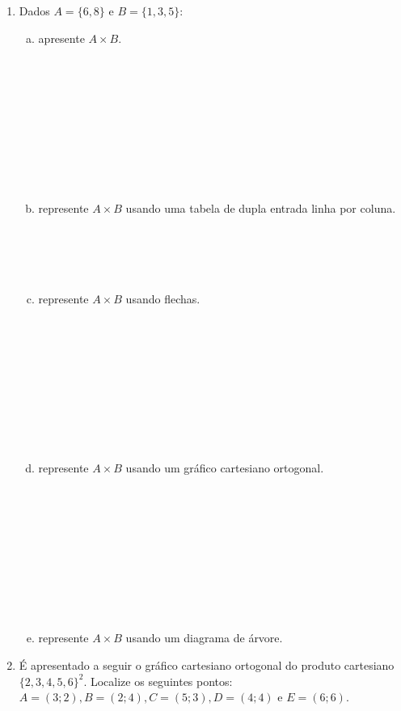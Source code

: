 \documentclass[a4paper,14pt]{article}
\begin{document}
\begin{multicols}{2}
\begin{enumerate}
			\item Dados $A = \{6, 8\}$ e $B = \{1, 3, 5\}$: \\
			\begin{enumerate}[a)]
				\item apresente $A \times B$. \\\\\\\\\\\\\\\\\\\\
				\item represente $A \times B$ usando uma tabela de dupla entrada linha por coluna. \\\\\\\\\\
				\item represente $A \times B$ usando flechas. \\\\\\\\\\\\\\\\\\\\
				\item represente $A \times B$ usando um gráfico cartesiano ortogonal. \\\\\\\\\\\\\\\\\\\\
				\item represente $A \times B$ usando um diagrama de árvore. \newpage
			\end{enumerate}
			\item É apresentado a seguir o gráfico cartesiano ortogonal do produto cartesiano $\{2, 3, 4, 5, 6\}^2$. Localize os seguintes pontos: $A = (3; 2), B = (2; 4), C = (5; 3), D = (4; 4)$ e $E = (6; 6)$. \\

\end{enumerate}
\end{multicols}
\end{document}
